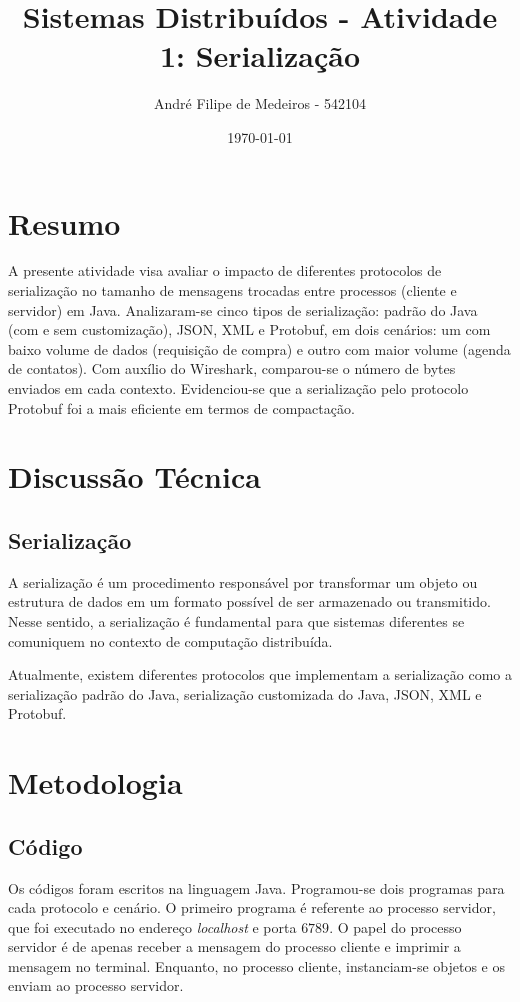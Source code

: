 \documentclass{article}
\title{Sistemas Distribuídos - Atividade 1: Serialização}
\author{André Filipe de Medeiros - 542104}
\date{\today}
\begin{document}
\maketitle

\newpage
\section{Resumo}
A presente atividade visa avaliar o impacto de diferentes protocolos de serialização no tamanho de mensagens trocadas entre processos (cliente e servidor) em Java. Analizaram-se cinco tipos de serialização: padrão do Java (com e sem customização), JSON, XML e Protobuf, em dois cenários: um com baixo volume de dados (requisição de compra) e outro com maior volume (agenda de contatos). Com auxílio do Wireshark, comparou-se o número de bytes enviados em cada contexto. Evidenciou-se que a serialização pelo protocolo Protobuf foi a mais eficiente em termos de compactação.

\section{Discussão Técnica}

\subsection{Serialização}
A serialização é um procedimento responsável por transformar um objeto ou estrutura de dados em um formato possível de ser armazenado ou transmitido. Nesse sentido, a serialização é fundamental para que sistemas diferentes se comuniquem no contexto de computação distribuída.

Atualmente, existem diferentes protocolos que implementam a serialização como a serialização padrão do Java, serialização customizada do Java, JSON, XML e Protobuf. 

\section{Metodologia}

\subsection{Código}
Os códigos foram escritos na linguagem Java. Programou-se dois programas para cada protocolo e cenário. O primeiro programa é referente ao processo servidor, que foi executado no endereço \textit{localhost} e porta $6789$. O papel do processo servidor é de apenas receber a mensagem do processo cliente e imprimir a mensagem no terminal. Enquanto, no processo cliente, instanciam-se objetos e os enviam ao processo servidor. 
\end{document}
